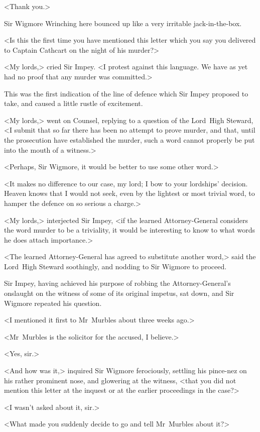 <Thank you.>

Sir Wigmore Wrinching here bounced up like a very irritable jack-in-the-box.

<Is this the first time you have mentioned this letter which you say you delivered to Captain Cathcart on the night of his murder?>

<My lords,> cried Sir Impey. <I protest against this language. We have as yet had no proof that any murder was committed.>

This was the first indication of the line of defence which Sir Impey proposed to take, and caused a little rustle of excitement.

<My lords,> went on Counsel, replying to a question of the Lord~High Steward, <I submit that so far there has been no attempt to prove murder, and that, until the prosecution have established the murder, such a word cannot properly be put into the mouth of a witness.>

<Perhaps, Sir Wigmore, it would be better to use some other word.>

<It makes no difference to our case, my lord; I bow to your lordships' decision. Heaven knows that I would not seek, even by the lightest or most trivial word, to hamper the defence on so serious a charge.>

<My lords,> interjected Sir Impey, <if the learned Attorney-General considers the word murder to be a triviality, it would be interesting to know to what words he does attach importance.>

<The learned Attorney-General has agreed to substitute another word,> said the Lord~High Steward soothingly, and nodding to Sir Wigmore to proceed.

Sir Impey, having achieved his purpose of robbing the Attorney-General's onslaught on the witness of some of its original impetus, sat down, and Sir Wigmore repeated his question.

<I mentioned it first to Mr~Murbles about three weeks ago.>

<Mr~Murbles is the solicitor for the accused, I believe.>

<Yes, sir.>

<And how was it,> inquired Sir Wigmore ferociously, settling his pince-nez on his rather prominent nose, and glowering at the witness, <that you did not mention this letter at the inquest or at the earlier proceedings in the case?>

<I wasn't asked about it, sir.>

<What made you suddenly decide to go and tell Mr~Murbles about it?>

